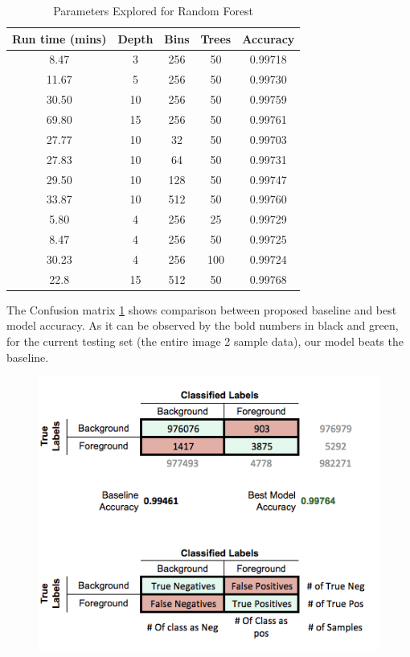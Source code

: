 \documentclass{neu_handout}
\begin{document}
\begin{table}[h!]
\centering
 \begin{tabular}{||c c c c c||} 
 \hline
Run time (mins) & Depth & Bins & Trees & Accuracy \\ [0.5ex] 
 \hline\hline
8.47  & 3  & 256 & 50 & 0.99718 \\
11.67 & 5  & 256 & 50 & 0.99730 \\
30.50 & 10 & 256 & 50 & 0.99759 \\
69.80 & 15 & 256 & 50 & 0.99761 \\
 \hline
27.77 & 10 & 32  & 50 & 0.99703 \\
27.83 & 10 & 64  & 50 & 0.99731 \\
29.50 & 10 & 128 & 50 & 0.99747 \\
33.87 & 10 & 512 & 50 & 0.99760 \\ 
 \hline 
5.80  & 4 & 256 & 25  & 0.99729 \\
8.47  & 4 & 256 & 50  & 0.99725 \\
30.23 & 4 & 256 & 100 & 0.99724 \\
\hline
\hline
22.8 	& 15  & 512 & 50 & 0.99768 \\[1ex] 
 \hline
 \end{tabular}
 \caption{Parameters Explored for Random Forest} \label{tab:parameters-runtime}
\end{table}



The Confusion matrix \ref{fig:confusionmatrix} shows comparison between proposed baseline and best model accuracy. As it can be observed by the bold numbers in black and green, for the current testing set (the entire image 2 sample data), our model beats the baseline.

\begin{center}
\begin{figure}[!h]
\centering
  \includegraphics[width=0.5\linewidth]{confusionmatrix}
  \label{fig:confusionmatrix}
\end{figure}
\end{center}
\end{document}

